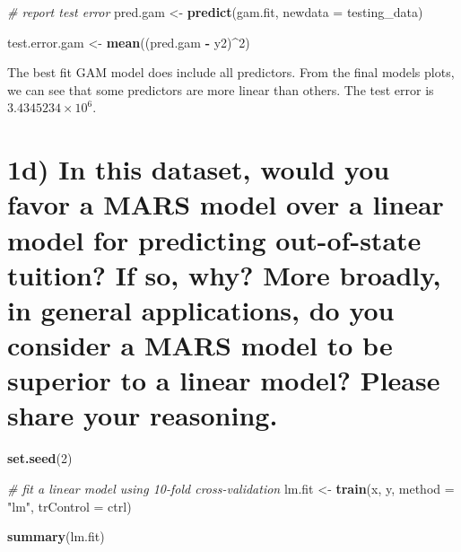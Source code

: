 \documentclass[
]{article}
\newenvironment{Shaded}{\begin{snugshade}}{\end{snugshade}}
\newcommand{\AttributeTok}[1]{\textcolor[rgb]{0.13,0.29,0.53}{#1}}
\newcommand{\CommentTok}[1]{\textcolor[rgb]{0.56,0.35,0.01}{\textit{#1}}}
\newcommand{\DecValTok}[1]{\textcolor[rgb]{0.00,0.00,0.81}{#1}}
\newcommand{\FunctionTok}[1]{\textcolor[rgb]{0.13,0.29,0.53}{\textbf{#1}}}
\newcommand{\NormalTok}[1]{#1}
\newcommand{\OtherTok}[1]{\textcolor[rgb]{0.56,0.35,0.01}{#1}}
\newcommand{\SpecialCharTok}[1]{\textcolor[rgb]{0.81,0.36,0.00}{\textbf{#1}}}
\newcommand{\StringTok}[1]{\textcolor[rgb]{0.31,0.60,0.02}{#1}}
\begin{document}
\begin{Shaded}
\begin{Highlighting}[]
\CommentTok{\# report test error}
\NormalTok{pred.gam }\OtherTok{\textless{}{-}} \FunctionTok{predict}\NormalTok{(gam.fit, }\AttributeTok{newdata =}\NormalTok{ testing\_data)}

\NormalTok{test.error.gam }\OtherTok{\textless{}{-}} \FunctionTok{mean}\NormalTok{((pred.gam }\SpecialCharTok{{-}}\NormalTok{ y2)}\SpecialCharTok{\^{}}\DecValTok{2}\NormalTok{)}
\end{Highlighting}
\end{Shaded}

The best fit GAM model does include all predictors. From the final
models plots, we can see that some predictors are more linear than
others. The test error is \ensuremath{3.4345234\times 10^{6}}.

\newpage

\hypertarget{d-in-this-dataset-would-you-favor-a-mars-model-over-a-linear-model-for-predicting-out-of-state-tuition-if-so-why-more-broadly-in-general-applications-do-you-consider-a-mars-model-to-be-superior-to-a-linear-model-please-share-your-reasoning.}{%
\section{1d) In this dataset, would you favor a MARS model over a linear
model for predicting out-of-state tuition? If so, why? More broadly, in
general applications, do you consider a MARS model to be superior to a
linear model? Please share your
reasoning.}\label{d-in-this-dataset-would-you-favor-a-mars-model-over-a-linear-model-for-predicting-out-of-state-tuition-if-so-why-more-broadly-in-general-applications-do-you-consider-a-mars-model-to-be-superior-to-a-linear-model-please-share-your-reasoning.}}

\begin{Shaded}
\begin{Highlighting}[]
\FunctionTok{set.seed}\NormalTok{(}\DecValTok{2}\NormalTok{)}

\CommentTok{\# fit a linear model using 10{-}fold cross{-}validation}
\NormalTok{lm.fit }\OtherTok{\textless{}{-}} \FunctionTok{train}\NormalTok{(x, y, }
                \AttributeTok{method =} \StringTok{"lm"}\NormalTok{,}
                \AttributeTok{trControl =}\NormalTok{ ctrl)}

\FunctionTok{summary}\NormalTok{(lm.fit)}
\end{Highlighting}
\end{Shaded}
\end{document}
